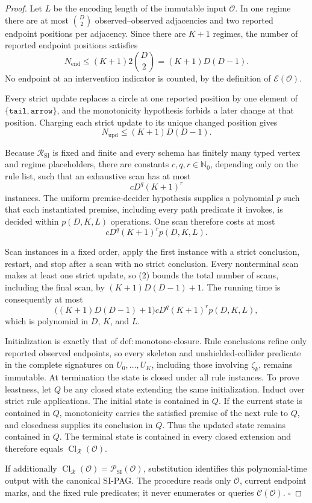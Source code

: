 \documentclass{article}
\begin{document}
\begin{proof}
Let \(L\) be the encoding length of the immutable input \(\mathcal O\).  In one regime there are at most \(\binom D2\) observed--observed adjacencies and two reported endpoint positions per adjacency.  Since there are \(K+1\) regimes, the number of reported endpoint positions satisfies
\[
 N_{\mathrm{end}}
 \leq (K+1)2\binom D2
 =(K+1)D(D-1).
 \tag{1}
\]
No endpoint at an intervention indicator is counted, by the definition of \(\mathcal E(\mathcal O)\).

Every strict update replaces a circle at one reported position by one element of \(\{\mathtt{tail},\mathtt{arrow}\}\), and the monotonicity hypothesis forbids a later change at that position.  Charging each strict update to its unique changed position gives
\[
 N_{\mathrm{upd}}\leq (K+1)D(D-1).
 \tag{2}
\]

Because \(\mathcal R_{\mathrm{SI}}\) is fixed and finite and every schema has finitely many typed vertex and regime placeholders, there are constants \(c,q,r\in\mathbb N_0\), depending only on the rule list, such that an exhaustive scan has at most
\[
 cD^q(K+1)^r
 \tag{3}
\]
instances.  The uniform premise-decider hypothesis supplies a polynomial \(p\) such that each instantiated premise, including every path predicate it invokes, is decided within \(p(D,K,L)\) operations.  One scan therefore costs at most
\[
 cD^q(K+1)^r p(D,K,L).
 \tag{4}
\]

Scan instances in a fixed order, apply the first instance with a strict conclusion, restart, and stop after a scan with no strict conclusion.  Every nonterminal scan makes at least one strict update, so (2) bounds the total number of scans, including the final scan, by \((K+1)D(D-1)+1\).  The running time is consequently at most
\[
 \bigl((K+1)D(D-1)+1\bigr)
 cD^q(K+1)^r p(D,K,L),
 \tag{5}
\]
which is polynomial in \(D\), \(K\), and \(L\).

Initialization is exactly that of \(\mathrm{def:monotone\mbox{-}closure}\).  Rule conclusions refine only reported observed endpoints, so every skeleton and unshielded-collider predicate in the complete signatures on \(U_0,\ldots,U_K\), including those involving \(\zeta_k\), remains immutable.  At termination the state is closed under all rule instances.  To prove leastness, let \(Q\) be any closed state extending the same initialization.  Induct over strict rule applications.  The initial state is contained in \(Q\).  If the current state is contained in \(Q\), monotonicity carries the satisfied premise of the next rule to \(Q\), and closedness supplies its conclusion in \(Q\).  Thus the updated state remains contained in \(Q\).  The terminal state is contained in every closed extension and therefore equals \(\operatorname{Cl}_{\mathcal R}(\mathcal O)\).

If additionally \(\operatorname{Cl}_{\mathcal R}(\mathcal O)=\mathcal P_{\mathrm{SI}}(\mathcal O)\), substitution identifies this polynomial-time output with the canonical SI-PAG.  The procedure reads only \(\mathcal O\), current endpoint marks, and the fixed rule predicates; it never enumerates or queries \(\mathcal C(\mathcal O)\).  \(\square\)
\end{proof}
\end{document}
